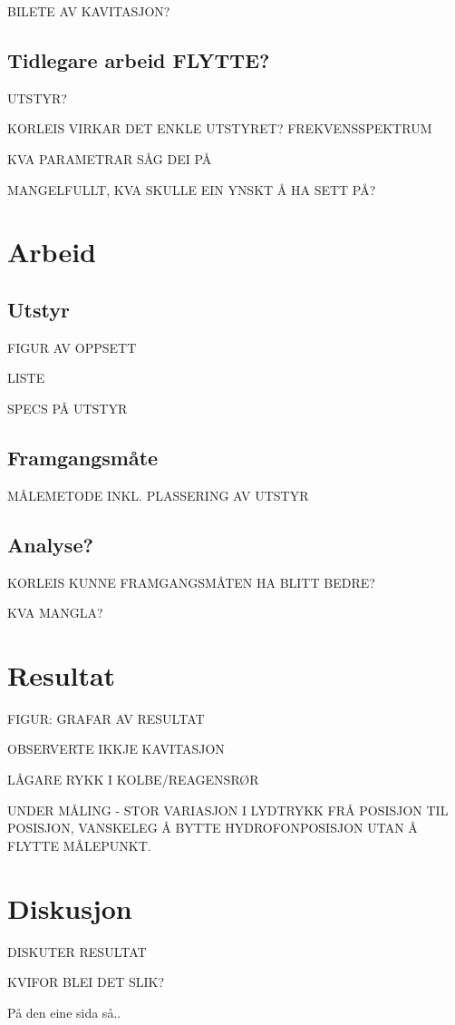 \documentclass[12pt,norsk]{article}
\begin{document}
BILETE AV KAVITASJON?

\subsection{Tidlegare arbeid FLYTTE?}
UTSTYR?

KORLEIS VIRKAR DET ENKLE UTSTYRET? FREKVENSSPEKTRUM

KVA PARAMETRAR SÅG DEI PÅ

MANGELFULLT, KVA SKULLE EIN YNSKT Å HA SETT PÅ?

\clearpage
\section{Arbeid}
\subsection{Utstyr}
FIGUR AV OPPSETT

LISTE

SPECS PÅ UTSTYR
\subsection{Framgangsmåte}
MÅLEMETODE INKL. PLASSERING AV UTSTYR

\subsection{Analyse?}
KORLEIS KUNNE FRAMGANGSMÅTEN HA BLITT BEDRE?

KVA MANGLA?

\clearpage
\section{Resultat}
FIGUR: GRAFAR AV RESULTAT

OBSERVERTE IKKJE KAVITASJON

LÅGARE RYKK I KOLBE/REAGENSRØR

UNDER MÅLING - STOR VARIASJON I LYDTRYKK FRÅ POSISJON TIL POSISJON, VANSKELEG Å BYTTE HYDROFONPOSISJON UTAN Å FLYTTE MÅLEPUNKT.

\section{Diskusjon}
DISKUTER RESULTAT

KVIFOR BLEI DET SLIK?



På den eine sida så..
\end{document}
